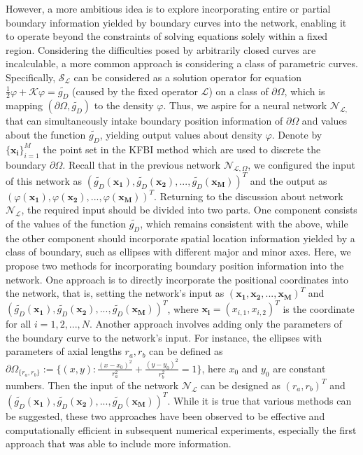 \documentclass{article}
\begin{document}
However, a more ambitious idea is to explore incorporating entire or partial boundary information yielded by boundary curves into the network, enabling it to operate beyond the constraints of solving equations solely within a fixed region. Considering the difficulties posed by arbitrarily closed curves are incalculable, a more common approach is considering a class of parametric curves. Specifically, $\mathcal{S}_{\mathcal{L}}$ can be considered as a solution operator for equation $\frac{1}{2} \varphi+\mathcal{K} \varphi =  \widetilde{g_D}$ (caused by the fixed operator $\mathcal{L}$) on a class of $\partial \Omega$, which is mapping $(\partial \Omega, \widetilde{g_D})$ to the density $\varphi$. Thus, we aspire for a neural network $\mathcal{N}_{\mathcal{L},}$ that can simultaneously intake boundary position information of $\partial \Omega$ and values about the function $\widetilde{g_D}$, yielding output values about density $\varphi$. Denote by $\{ \mathbf{x_i} \} _{i = 1}^{M}$ the point set in the KFBI method which are used to discrete the boundary $\partial \Omega$. Recall that in the previous network $\mathcal{N}_{\mathcal{L}, \Omega}$, we configured the input of this network as $(\widetilde{g_D}(\mathbf{x_1}), \widetilde{g_D}(\mathbf{x_2}), ..., \widetilde{g_D}(\mathbf{x_M}))^T$ and the output as $(\varphi(\mathbf{x_1}), \varphi(\mathbf{x_2}), ..., \varphi(\mathbf{x_M}))^T$. Returning to the discussion about network $\mathcal{N}_{\mathcal{L}}$, the required input should be divided into two parts. One component consists of the values of the function $\widetilde{g_D}$, which remains consistent with the above, while the other component should incorporate spatial location information yielded by a class of boundary, such as ellipses with different major and minor axes. Here, we propose two methods for incorporating boundary position information into the network. One approach is to directly incorporate the positional coordinates into the network, that is, setting the network's input as $(\mathbf{x_1}, \mathbf{x_2}, ..., \mathbf{x_M})^T$ and $(\widetilde{g_D}(\mathbf{x_1}), \widetilde{g_D}(\mathbf{x_2}), ..., \widetilde{g_D}(\mathbf{x_M}))^T$, where $\mathbf{x_i} = (x_{i, 1}, x_{i, 2})^T$ is the coordinate for all $i = 1, 2, ..., N$. Another approach involves adding only the parameters of the boundary curve to the network's input. For instance, the ellipses with parameters of axial lengths $r_a, r_b$ can be defined as $\partial \Omega_{\{r_a, r_b\}} := \{(x, y): \frac{(x - x_0)^2}{r_a^2} + \frac{(y - y_0)^2}{r_b^2} = 1\}$, here $x_0$ and $y_0$ are constant numbers. Then the input of the network $\mathcal{N}_{\mathcal{L}}$ can be designed as $(r_a, r_b)^T$ and $(\widetilde{g_D}(\mathbf{x_1}), \widetilde{g_D}(\mathbf{x_2}), ..., \widetilde{g_D}(\mathbf{x_M}))^T$. While it is true that various methods can be suggested, these two approaches have been observed to be effective and computationally efficient in subsequent numerical experiments, especially the first approach that was able to include more information.
\end{document}
